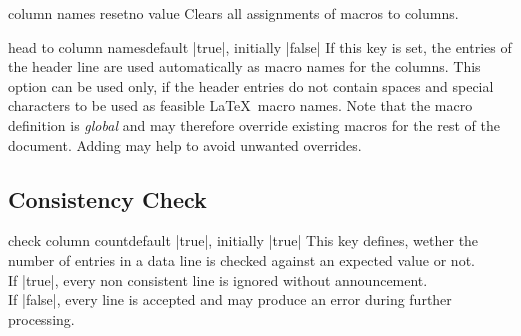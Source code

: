 \documentclass[a4paper,11pt]{ltxdoc}
\begin{document}
\begin{docCsvKey}{column names reset}{}{no value}
  Clears all assignments of macros to columns.
\end{docCsvKey}


\begin{docCsvKey}{head to column names}{}{default |true|, initially |false|}
  If this key is set, the entries of the header line are used automatically
  as macro names for the columns. This option can be used only, if
  the header entries do not contain spaces and special characters to be
  used as feasible \LaTeX\ macro names.
  Note that the macro definition is \emph{global} and may therefore override
  existing macros for the rest of the document. Adding
   may help to avoid unwanted
  overrides.
\end{docCsvKey}




\clearpage
\subsection{Consistency Check}\label{sec:consistency}%

\begin{docCsvKey}{check column count}{}{default |true|, initially |true|}
  This key defines, wether the number of entries in a data line is checked against
  an expected value or not.\\
  If |true|, every non consistent line is ignored without announcement.\\
  If |false|, every line is accepted and may produce an error during
  further processing.
\end{docCsvKey}
\end{document}

